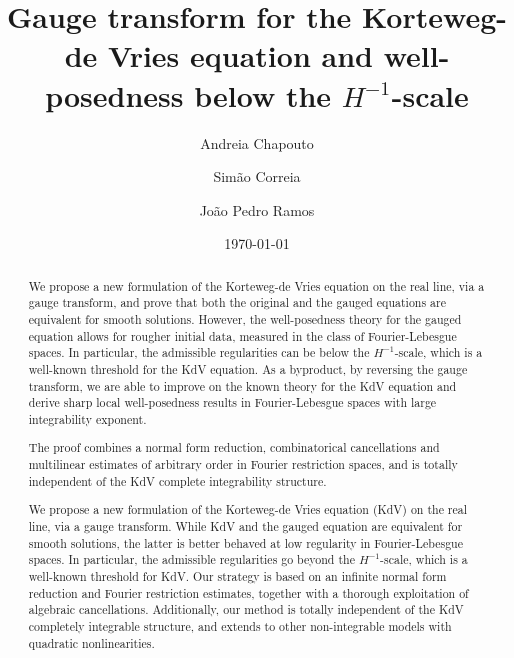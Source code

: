 \documentclass[%
11pt,  reqno]{amsart}
\title[Gauge transform for KdV]{Gauge transform for the Korteweg-de Vries equation and well-posedness below the $H^{-1}$-scale}
\author[A.~Chapouto \and S.~Correia \and J.~P.~Ramos]
{Andreia Chapouto \and Sim\~ao Correia \and Jo\~ao Pedro Ramos}
\date{\today}
\newcommand{\5}{\textup{V}}
\theoremstyle{remark}
\numberwithin{equation}{section}
\numberwithin{theorem}{section}
\begin{document}
\begin{abstract}
We propose a new formulation of the Korteweg-de Vries equation on the real line, via a gauge transform, and prove that both the original and the gauged equations are equivalent for smooth solutions. However, the well-posedness theory for the gauged equation allows for rougher initial data, measured in the class of Fourier-Lebesgue spaces. In particular, the admissible regularities can be below the $H^{-1}$-scale, which is a well-known threshold for the KdV equation. As a byproduct, by reversing the gauge transform, we are able to improve on the known theory for the KdV equation and derive sharp local well-posedness results in Fourier-Lebesgue spaces with large integrability exponent.

The proof combines a normal form reduction, combinatorical cancellations and multilinear estimates of arbitrary order in Fourier restriction spaces, and is totally independent of the KdV complete integrability structure.

{
\color{blue}

We propose a new formulation of the Korteweg-de Vries equation (KdV) on the real line, via a gauge transform.
While KdV and the gauged equation are equivalent for smooth solutions, the latter is better behaved at low regularity in Fourier-Lebesgue spaces. In particular, the admissible regularities go beyond the $H^{-1}$-scale, which is a well-known threshold for KdV. 
% 
Our strategy is based on an infinite normal form reduction and Fourier restriction estimates, together with a thorough exploitation of algebraic cancellations. Additionally, our method is totally independent of the KdV completely integrable structure, and extends to other non-integrable models with quadratic nonlinearities. 
}

\end{abstract}
    
	\maketitle
	
	
	
	
	




\end{document}
